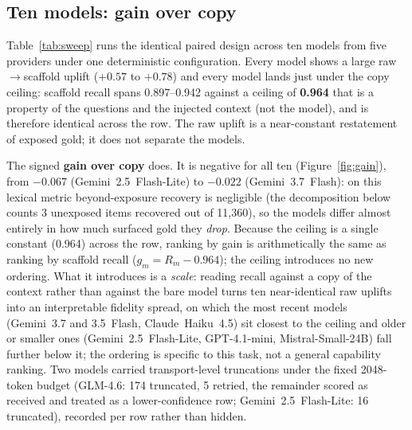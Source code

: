 \documentclass[10pt,twocolumn]{article}
\begin{document}
\subsection{Ten models: gain over copy}\label{sec:tenmodel}
Table~\ref{tab:sweep} runs the identical paired design across ten models from five providers under one
deterministic configuration. Every model shows a large raw$\to$scaffold uplift ($+0.57$ to $+0.78$)
and every model lands just under the copy ceiling: scaffold recall spans 0.897--0.942 against a
ceiling of \textbf{0.964} that is a property of the questions and the injected context (not the
model), and is therefore identical across the row. The raw uplift is a near-constant restatement of
exposed gold; it does not separate the models.

The signed \textbf{gain over copy} does. It is negative for all ten (Figure~\ref{fig:gain}), from
$-0.067$ (Gemini~2.5~Flash-Lite) to $-0.022$ (Gemini~3.7~Flash): on this lexical metric
beyond-exposure recovery is negligible (the decomposition below counts 3 unexposed items recovered
out of 11{,}360), so the models differ almost entirely in how much surfaced gold they \emph{drop}. Because the ceiling is a single constant (0.964) across the row,
ranking by gain is arithmetically the same as ranking by scaffold recall ($g_m=R_m-0.964$); the
ceiling introduces no new ordering. What it introduces is a \emph{scale}: reading recall against a copy
of the context rather than against the bare model turns ten near-identical raw uplifts into an
interpretable fidelity spread, on which the most recent models (Gemini~3.7 and 3.5~Flash,
Claude~Haiku~4.5) sit closest to the ceiling and older or smaller ones (Gemini~2.5~Flash-Lite,
GPT-4.1-mini, Mistral-Small-24B) fall further below it; the ordering is specific to this task, not a
general capability ranking. Two models carried transport-level truncations
under the fixed 2048-token budget (GLM-4.6: 174 truncated, 5 retried, the remainder scored as received
and treated as a lower-confidence row; Gemini~2.5~Flash-Lite: 16 truncated), recorded per row rather
than hidden.
\end{document}
